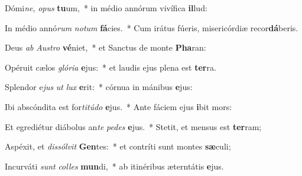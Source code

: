 \item Dómi\textit{ne}, \textit{o}\textit{pus} \textbf{tu}um,~* in médio annórum vivífica \textbf{il}lud:
\item In médio annó\textit{rum} \textit{no}\textit{tum} \textbf{fá}cies.~* Cum irátus fúeris, misericórdiæ recor\textbf{dá}beris.
\item Deus \textit{ab} \textit{Aus}\textit{tro} \textbf{vé}niet,~* et Sanctus de monte \textbf{Pha}ran:
\item Opéruit cælos \textit{gló}\textit{ri}\textit{a} \textbf{e}jus:~* et laudis ejus plena est \textbf{ter}ra.
\item Splendor e\textit{jus} \textit{ut} \textit{lux} \textbf{e}rit:~* córnua in mánibus \textbf{e}jus:
\item Ibi abscóndita est for\textit{ti}\textit{tú}\textit{do} \textbf{e}jus.~* Ante fáciem ejus \textbf{i}bit mors:
\item Et egrediétur diábolus an\textit{te} \textit{pe}\textit{des} \textbf{e}jus.~* Stetit, et mensus est \textbf{ter}ram;
\item Aspéxit, et \textit{dis}\textit{sól}\textit{vit} \textbf{Gen}tes:~* et contríti sunt montes \textbf{sæ}culi;
\item Incurváti \textit{sunt} \textit{col}\textit{les} \textbf{mun}di,~* ab itinéribus æterntátis \textbf{e}jus.
